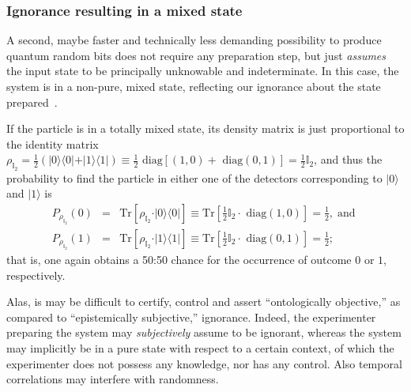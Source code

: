 \documentclass[10pt]{article}%
\begin{document}
\subsubsection{Ignorance resulting in a mixed state}

A second, maybe faster and technically less demanding possibility to produce quantum random bits
does not require any preparation step, but just {\em assumes}
the input state to be principally unknowable and indeterminate.
In this case, the system is in a non-pure, mixed state,
reflecting our ignorance about the state prepared~\cite[2nd part, \S~10, p.~827]{schrodinger}.


If the particle is in a totally mixed state,
its density matrix is just proportional to the identity matrix
$\rho_{\mathbb{I}_2 }=\frac{1}{2}\left(
\vert 0 \rangle \langle  0 \vert + \vert 1  \rangle \langle  1 \vert
\right) \equiv \frac{1}{2} \textrm{ diag}\left[\left(1,0 \right) +\textrm{ diag}\left(0,1 \right)\right] = \frac{1}{2}\mathbb{I}_2   $,
and thus the probability to find the particle in either one of the detectors corresponding to
$\vert 0 \rangle $ and
$\vert 1  \rangle $ is
\begin{equation}
\begin{array}{rcl}
P_{\rho_{\mathbb{I}_2 }}(0)&=&
\textrm{Tr} \left[
\rho_{\mathbb{I}_2 } \cdot \vert 0 \rangle \langle  0 \vert
\right]
\equiv
\textrm{Tr}
\left[
\frac{1}{2}\mathbb{I}_2
\cdot
\textrm{ diag}\left(1,0 \right)
\right]
=\frac{1}{2},\;\textrm{
and } \\[2ex]
P_{\rho_{\mathbb{I}_2 }}(1)&=&
\textrm{Tr} \left[
\rho_{\mathbb{I}_2 } \cdot \vert 1  \rangle \langle  1 \vert
\right]
\equiv
\textrm{Tr}
\left[
\frac{1}{2}\mathbb{I}_2
\cdot
\textrm{ diag}\left(0,1 \right)
\right]
=\frac{1}{2};
\end{array}
\end{equation}
that is, one again obtains a 50:50 chance for the occurrence of outcome $0$ or $1$, respectively.



Alas, is may be difficult to certify, control and assert ``ontologically objective,'' as compared to ``epistemically subjective,'' ignorance.
Indeed, the experimenter
preparing the system may {\em subjectively} assume to be ignorant,
whereas the system may implicitly be in a pure state with respect to a certain context, of which
the experimenter does not possess any knowledge, nor has any control.
Also temporal correlations may interfere with randomness.
\end{document}
